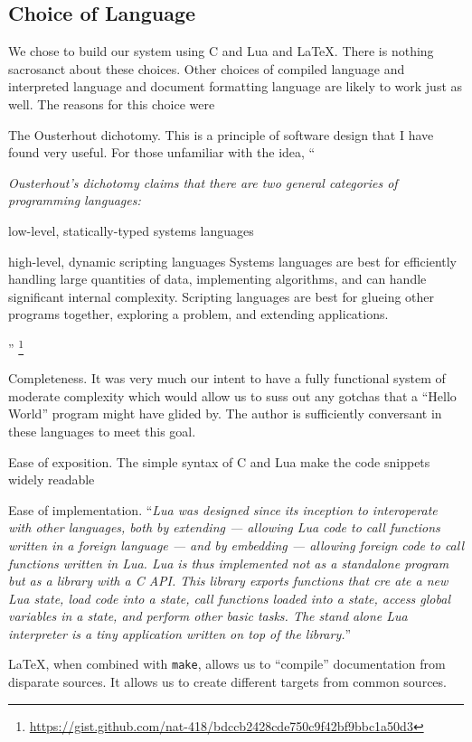 \documentclass[letterpaper,12pt]{article}
\begin{document}
\subsection{Choice of Language}

We chose to build our system using C and Lua and \LaTeX.  
There is nothing sacrosanct about these choices. Other 
choices of compiled language and interpreted
language and document formatting language are likely to work just as well. 
The reasons for this choice were
\be
\item The Ousterhout dichotomy. This is a principle of software design that I
  have found very useful. For those unfamiliar with the idea, 
``{\em Ousterhout's dichotomy claims that there are two general categories of programming languages:
\be
\item low-level, statically-typed systems languages
\item high-level, dynamic scripting languages
  \ee
Systems languages are best for efficiently handling large quantities of data,
implementing algorithms, and can handle significant internal complexity.
Scripting languages are best for glueing other programs together, exploring a
problem, and extending applications.}
''
\footnote{\url{https://gist.github.com/nat-418/bdccb2428cde750c9f42bf9bbc1a50d3}}

\item Completeness. 
It was very much our intent to
have a fully functional system of moderate complexity which would allow us to
suss out any gotchas that a ``Hello World'' program might have glided by.
The author is sufficiently conversant in these languages to meet this goal.

\item Ease of exposition. 
  The simple syntax of C and Lua make the code snippets widely
  readable
\item Ease of implementation.
  ``{\em Lua was designed since its inception to interoperate with
other languages, both by extending --- allowing Lua code to call functions
written in a foreign language --- and by embedding --- allowing foreign code to call functions written in Lua. Lua is
thus implemented not as a standalone
program but as a library with a C API.
This library exports functions that cre ate a new Lua state, load code into a
state, call functions loaded into a state,
access global variables in a state, and
perform other basic tasks. The stand alone Lua interpreter is a tiny application
written on top of the library.}'' \cite{Lua2019}
\item \LaTeX, when combined with {\tt make}, allows us to ``compile''
  documentation from disparate sources. It allows us to create 
  different targets from common sources. 
\ee
\end{document}
